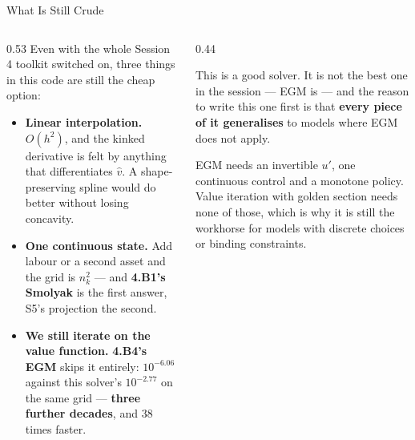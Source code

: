 \begin{frame}{What Is Still Crude}
\begin{columns}[T]
\begin{column}{0.53\textwidth}
\small
Even with the whole Session 4 toolkit switched on, three things in this code are still the cheap option:
\medskip
\begin{itemize}\footnotesize
  \item \textbf{Linear interpolation.} $O(h^{2})$, and the kinked derivative is felt by anything that differentiates $\hat v$. A shape-preserving spline would do better without losing concavity.
  \item \textbf{One continuous state.} Add labour or a second asset and the grid is $n_k^{2}$ --- and \textbf{4.B1's Smolyak} is the first answer, S5's projection the second.
  \item \textbf{We still iterate on the value function.} \textbf{4.B4's EGM} skips it entirely: $10^{-6.06}$ against this solver's $10^{-2.77}$ on the same grid --- \textbf{three further decades}, and 38 times faster.
\end{itemize}
\end{column}
\begin{column}{0.44\textwidth}
\begin{takeawaybox}[title=\textbf{The honest summary}]\small
This is a good solver. It is not the best one in the session --- EGM is --- and the reason to write this one first is that \textbf{every piece of it generalises} to models where EGM does not apply.
\end{takeawaybox}
\medskip
\begin{examplebox}\footnotesize
EGM needs an invertible $u'$, one continuous control and a monotone policy. Value iteration with golden section needs none of those, which is why it is still the workhorse for models with discrete choices or binding constraints.
\end{examplebox}
\end{column}
\end{columns}
\end{frame}

